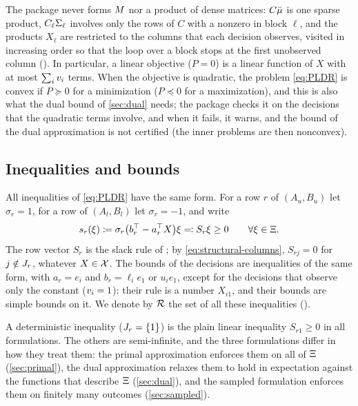 The package never forms $M$ nor a product of dense matrices:
$C\bar\mu$ is one sparse product, $C_\ell\Sigma_{\ell}$ involves only the rows of $C$ with a nonzero in block $\ell$,
and the products $X_\ell$ are restricted to the columns that each decision observes,
visited in increasing order so that the loop over a block stops at the first unobserved column ().
In particular, a linear objective ($P = 0$) is a linear function of $X$ with at most $\sum_i v_i$ terms.
When the objective is quadratic,
the problem \eqref{eq:PLDR} is convex if $P \succeq 0$ for a minimization ($P \preceq 0$ for a maximization),
and this is also what the dual bound of \cref{sec:dual} needs;
the package checks it on the decisions that the quadratic terms involve,
and when it fails, it warns, and the bound of the dual approximation is not certified (the inner problems are then nonconvex).

\subsection{Inequalities and bounds}

All inequalities of \eqref{eq:PLDR} have the same form.
For a row $r$ of $(A_u, B_u)$ let $\sigma_r = 1$, for a row of $(A_l, B_l)$ let $\sigma_r = -1$, and write
\begin{equation}
\label{eq:slack-rule}
s_r(\xi) \coloneqq \sigma_r \bigl(b_r^\top - a_r^\top X\bigr)\xi \eqqcolon S_r \xi \ge 0 \qquad \forall \xi \in \Xi.
\end{equation}
The row vector $S_r$ is the slack rule of \citet{KWG2011}; by \eqref{eq:structural-columns}, $S_{rj} = 0$ for $j \notin J_r$, whatever $X \in \mathcal{X}$.
The bounds of the decisions are inequalities of the same form, with $a_r = e_i$ and $b_r = \ell_i e_1$ or $u_i e_1$,
except for the decisions that observe only the constant ($v_i = 1$):
their rule is a number $X_{i1}$, and their bounds are simple bounds on it.
We denote by $\mathcal{R}$ the set of all these inequalities ().

A deterministic inequality ($J_r = \{1\}$) is the plain linear inequality $S_{r1} \ge 0$ in all formulations.
The others are semi-infinite, and the three formulations differ in how they treat them:
the primal approximation enforces them on all of $\Xi$ (\cref{sec:primal}),
the dual approximation relaxes them to hold in expectation against the functions that describe $\Xi$ (\cref{sec:dual}),
and the sampled formulation enforces them on finitely many outcomes (\cref{sec:sampled}).
